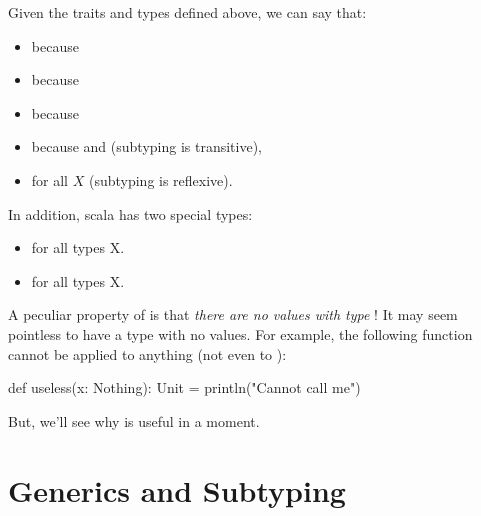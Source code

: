 \documentclass{book}
\begin{document}
Given the traits and types defined above, we can say that:
\begin{itemize}

  \item {} because 

  \item {} because 

  \item {} because 

  \item {} because  and
   (subtyping is transitive),

  \item {} for all $X$ (subtyping is reflexive).

\end{itemize}
%
In addition, scala has two special types:
%
\begin{itemize}

  \item {} for all types X.

  \item {} for all types X.

\end{itemize}

A peculiar property of  is that
\emph{there are no values with type} !
It may seem pointless to have a type with no values. For example, the following
function cannot be applied to anything (not even to ):
\begin{scalacode}
def useless(x: Nothing): Unit = {
  println("Cannot call me")
}
\end{scalacode}

But, we'll see why  is useful in a moment.

\section{Generics and Subtyping}
\end{document}
